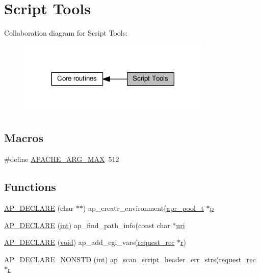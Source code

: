 \hypertarget{group__APACHE__CORE__SCRIPT}{}\section{Script Tools}
\label{group__APACHE__CORE__SCRIPT}
Collaboration diagram for Script Tools\+:
\nopagebreak
\begin{figure}[H]
\begin{center}
\leavevmode
\includegraphics[width=260pt]{group__APACHE__CORE__SCRIPT}
\end{center}
\end{figure}
\subsection*{Macros}
\begin{DoxyCompactItemize}
\item 
\#define \hyperlink{group__APACHE__CORE__SCRIPT_ga63f9862f725a3f506580dde3112e7643}{A\+P\+A\+C\+H\+E\+\_\+\+A\+R\+G\+\_\+\+M\+AX}~512
\end{DoxyCompactItemize}
\subsection*{Functions}
\begin{DoxyCompactItemize}
\item 
\hyperlink{group__APACHE__CORE__SCRIPT_ga4bf170d3f4776e4b656db04f5b4c3e90}{A\+P\+\_\+\+D\+E\+C\+L\+A\+RE} (char $\ast$$\ast$) ap\+\_\+create\+\_\+environment(\hyperlink{structapr__pool__t}{apr\+\_\+pool\+\_\+t} $\ast$\hyperlink{group__APACHE__CORE__MPM_ga5cd91701e5c167f2b1a38e70ab57817e}{p}
\item 
\hyperlink{group__APACHE__CORE__SCRIPT_ga07d2bc04848924a81b85612e500676ea}{A\+P\+\_\+\+D\+E\+C\+L\+A\+RE} (\hyperlink{pcre_8txt_a42dfa4ff673c82d8efe7144098fbc198}{int}) ap\+\_\+find\+\_\+path\+\_\+info(const char $\ast$\hyperlink{group__APR__Util__XML_ga69ec24fb2d0a5f5e532deb9adaab81d6}{uri}
\item 
\hyperlink{group__APACHE__CORE__SCRIPT_ga8208f3c20145c9443ec47d576e2fa501}{A\+P\+\_\+\+D\+E\+C\+L\+A\+RE} (\hyperlink{group__MOD__ISAPI_gacd6cdbf73df3d9eed42fa493d9b621a6}{void}) ap\+\_\+add\+\_\+cgi\+\_\+vars(\hyperlink{structrequest__rec}{request\+\_\+rec} $\ast$\hyperlink{pcregrep_8txt_a2e9e9438b26c0bb4425367a7e4f75eb3}{r})
\item 
\hyperlink{group__APACHE__CORE__SCRIPT_ga4d021ea91f99278b88e145101bfcd9ae}{A\+P\+\_\+\+D\+E\+C\+L\+A\+R\+E\+\_\+\+N\+O\+N\+S\+TD} (\hyperlink{pcre_8txt_a42dfa4ff673c82d8efe7144098fbc198}{int}) ap\+\_\+scan\+\_\+script\+\_\+header\+\_\+err\+\_\+strs(\hyperlink{structrequest__rec}{request\+\_\+rec} $\ast$\hyperlink{pcregrep_8txt_a2e9e9438b26c0bb4425367a7e4f75eb3}{r}
\end{DoxyCompactItemize}
